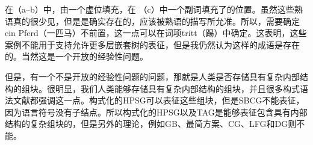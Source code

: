 \zl
在（a--b）中，\vfc 由一个虚位填充，在 （c）中一个副词填充了\vfc 的位置。虽然这些熟语真的很少见，但是是确实存在的，应该被熟语的描写所允准。所以，需要确定ein Pferd（一匹马）不前置，这一点可以在词项tritt（踢）中确定。这表明，这些案例不能用于支持允许更多层嵌套树的表征，但是我仍然认为这样的成语是存在的。当然这是一个开放的经验性问题。

但是，有一个不是开放的经验性问题的问题，那就是人类是否存储具有复杂内部结构的组块。很明显，我们人类能够存储具有复杂内部结构的组块，并且很多构式语法文献都强调这一点。构式化的HPSG可以表征这些组块，但是SBCG不能表征，因为语言符号没有子结点。所以构式化的HPSG以及TAG是能够表征包含具有内部结构的复杂组块的，但是另外的理论，例如GB、最简方案、CG、LFG和DG则不能。



  
